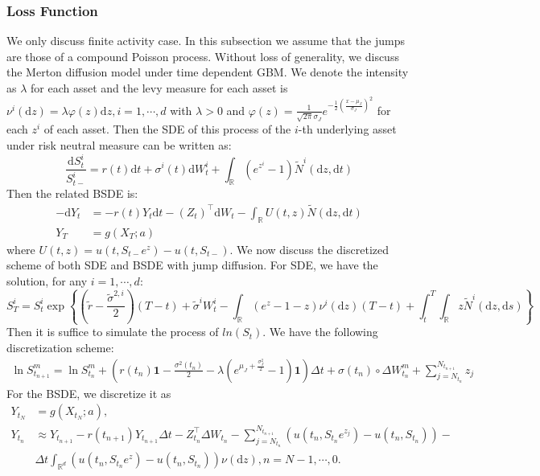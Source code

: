 \documentclass[11pt,a4paper]{article}
\theoremstyle{remark}
\begin{document}
	\subsubsection{Loss Function}
	We only discuss finite activity case. In this subsection we assume that the jumps are those of a compound Poisson process. Without loss of generality, we discuss the Merton diffusion model under time dependent GBM. We denote the intensity  as $\lambda$ for each asset and the levy measure for each asset is $\nu^i(\mathrm{d} z) = \lambda \varphi(z) \mathrm{d} z, i=1,\cdots,d$ with $\lambda > 0$ and $\varphi(z) = \frac{1}{\sqrt{2 \pi} \sigma_J}e^{{-\frac{1}{2}}\left( \frac{x - \mu_J}{\sigma_J}\right)^2} $ for each $z^i$ of each asset. Then the SDE of this process of the $i$-th underlying asset under risk neutral measure can be written as:
	\begin{equation*}
		\frac{\mathrm{d} S_t^i}{S_{t-}^i}=r(t) \mathrm{d} t+\sigma^i(t) \mathrm{d} W^{i}_t+\int_{\mathbb{R}}\left(e^{z^i}-1\right) \tilde{N}^i\left(\mathrm{d} z, \mathrm{d} t\right)
	\end{equation*}
	Then the related BSDE is:
	\begin{align*}
		-\mathrm{d}Y_t &= -r(t) Y_t \mathrm{d} t - (Z_t)^{\top}  \mathrm{d} W_t - \int_{\mathbb{R}}U(t,z) \tilde{N}\left(\mathrm{d} z, \mathrm{d} t\right) \\
		Y_T &= g(X_T; a)
	\end{align*}
	where $U(t, z) = u(t, S_{t-}e^z) - u(t, S_{t-})$. We now discuss the discretized scheme of both SDE and BSDE with jump diffusion. For  SDE, we have the solution, for any $i = 1, \cdots, d$:
	\begin{equation}\label{eq:jumpSDE}
		S_T^i=S_t^i \exp \left\{\left(\tilde{r}-\frac{\tilde{\sigma}^{2, i}}{2}\right)(T-t)+\tilde{\sigma}^i W_t^{i}-\int_{\mathbb{R}}\left(e^z-1-z\right) \nu^i(\mathrm{d} z)(T-t)+\int_t^T \int_{\mathbb{R}} z \tilde{N}^i(\mathrm{d} z, \mathrm{d} s)\right\}
	\end{equation}
	Then it is suffice to simulate the process of $ln(S_t)$. We have the following discretization scheme:
	\begin{align}\label{eq:discSDE}
		\ln S^m_{t_{n+1}} = \ln S^m_{t_{n}} + \left(r(t_n) \boldsymbol{1}-\frac{\sigma^2(t_n)}{2} - \lambda\left(e^{\mu_J + \frac{\sigma^2_J}{2}} - 1\right) \boldsymbol{1} \right)\Delta t +  \sigma(t_n)\circ\Delta W^m_{t_n} +\sum_{j=N_{t_n}}^{N_{t_{n+1}}}z_j
	\end{align}
	For the BSDE, we discretize it as 
	\begin{align}\label{eq:disc-jumpBSDE}
		Y_{t_N} & = g(X_{t_N}; a),  \\
		Y_{t_n} &\approx Y_{t_{n+1}} - r(t_{n+1}) Y_{t_{n+1}}\Delta t  -  Z_{t_n}^\top \Delta W_{t_n}-
		\sum_{j=N_{t_n}}^{N_{t_{n+1}}}\left(u(t_n, S_{t_n}e^{z_j}) - u(t_n, S_{t_n})\right) - \\
		&\Delta t \int_{\mathbb{R}^d}\left(u(t_n, S_{t_n}e^{z}) - u(t_n, S_{t_n})\right)\nu(\mathrm{d}z) , n=N-1,\cdots,0. 
	\end{align}
\end{document}
